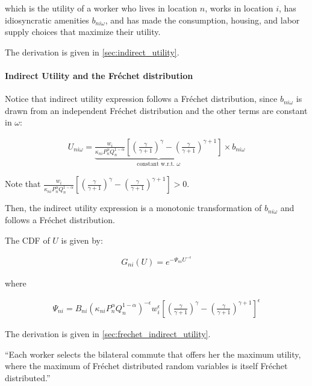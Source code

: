 \documentclass[10pt]{article}
\begin{document}
which is the utility of a worker who lives in location $n$,
works in location $i$, has idiosyncratic amenities $b_{n i \omega}$,
and has made the consumption, housing, and labor supply choices that
maximize their utility.

The derivation is given in \autoref{sec:indirect_utility}.

\paragraph{Indirect Utility and the Fréchet distribution}

Notice that indirect utility expression follows a Fréchet distribution,
since $b_{n i \omega}$ is drawn from an independent Fréchet distribution
and the other terms are constant in $\omega$:

\begin{align}
    U_{n i \omega}=\underbrace{\frac{w_i}{\kappa_{n i} P_n^\alpha Q_n^{1-\alpha}} \left[\left(\frac{\gamma}{\gamma+1}\right)^\gamma-\left(\frac{\gamma}{\gamma+1}\right)^{\gamma+1}\right]}_{\text {constant w.r.t. } \omega} \times b_{n i \omega}
\end{align}

Note that $\frac{w_i}{\kappa_{n i} P_n^\alpha Q_n^{1-\alpha}} \left[\left(\frac{\gamma}{\gamma+1}\right)^\gamma-\left(\frac{\gamma}{\gamma+1}\right)^{\gamma+1}\right] > 0$.

Then, the indirect utility expression is a monotonic 
transformation of $b_{n i \omega}$ and 
follows a Fréchet distribution.

The CDF of $U$ is given by:

\begin{align}
    G_{n i}(U)=e^{-\Psi_{n i} U^{-\epsilon}} \label{eq:frechet_indirect_utility}
\end{align}

where 

\begin{align}
    \Psi_{n i}=B_{n i}\left(\kappa_{n i} P_n^\alpha Q_n^{1-\alpha}\right)^{-\epsilon} w_i^\epsilon \left[\left(\frac{\gamma}{\gamma+1}\right)^\gamma-\left(\frac{\gamma}{\gamma+1}\right)^{\gamma+1}\right]^\epsilon
\end{align}

The derivation is given in \autoref{sec:frechet_indirect_utility}.

``Each worker selects the
bilateral commute that offers her the maximum utility, where the maximum of
Fréchet distributed random variables is itself Fréchet distributed.''
\end{document}
